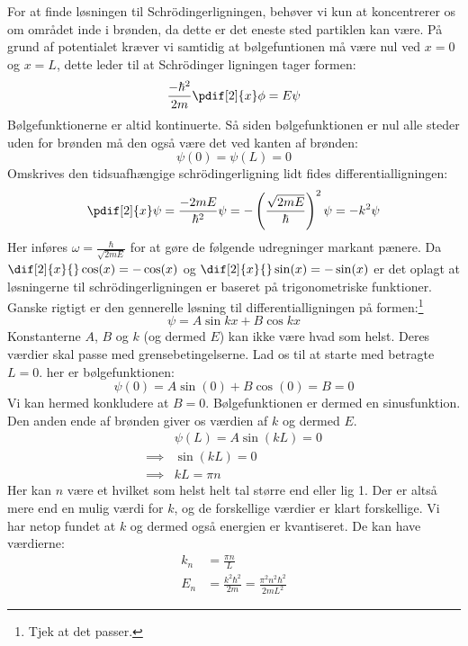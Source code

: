 For at finde løsningen til Schrödingerligningen, behøver vi kun at koncentrerer os om området inde i brønden, da dette er det eneste sted partiklen kan være. På grund af potentialet kræver vi samtidig at bølgefuntionen må være nul ved $x=0$ og $x=L$, dette leder til at Schrödinger ligningen tager formen:
\begin{equation}
    \frac{-\hbar^2}{2m}\pdif[2]{x}\phi=E\psi
    \label{kvant:eq:infb}
\end{equation}
Bølgefunktionerne er altid kontinuerte. Så siden bølgefunktionen er nul alle steder uden for brønden må den også være det ved kanten af brønden:
$$
\psi(0)=\psi(L) = 0
$$
Omskrives den tidsuafhængige schrödingerligning lidt fides differentialligningen:
\begin{equation}
\pdif[2]{x}\psi = \frac{-2mE}{\hbar^2}\psi = -\left(\frac{\sqrt{2mE}}{\hbar}\right)^2\psi = -k^2\psi
\end{equation}
Her inføres $\omega = \frac{\hbar}{\sqrt{2mE}}$ for at gøre de følgende udregninger markant pænere.
Da $\dif[2]{x}{}\cos(x) = -\cos(x)$ og $\dif[2]{x}{}\sin(x) = -\sin(x)$ er det oplagt at løsningerne til schrödingerligningen er baseret på trigonometriske funktioner. Ganske rigtigt er den gennerelle løsning til differentialligningen på formen:\footnote{Tjek at det passer.}
\begin{equation}
\psi = A\sin k x+B\cos k x
\end{equation}
Konstanterne $A$, $B$ og $k$ (og dermed $E$) kan ikke være hvad som helst. Deres værdier skal passe med grensebetingelserne. Lad os til at starte med betragte $L=0$. her er bølgefunktionen:
\begin{equation}
\psi(0) = A\sin(0)+B\cos(0) = B = 0
\end{equation}
Vi kan hermed konkludere at $B=0$. Bølgefunktionen er dermed en sinusfunktion.
Den anden ende af brønden giver os værdien af $k$ og dermed $E$. 
\begin{align*}
&\psi(L) = A\sin(k L) = 0\\
\implies &\sin(k L) = 0\\
\implies &k L = \pi n
\end{align*}
Her kan $n$ være et hvilket som helst helt tal større end eller lig 1. Der er altså mere end en mulig værdi for $k$, og de forskellige værdier er klart forskellige. Vi har netop fundet at $k$ og dermed også energien er kvantiseret. De kan have værdierne:
\begin{align}
k_n &= \frac{\pi n}{L}\\
E_n &= \frac{k^2\hbar^2}{2m} = \frac{\pi^2n^2\hbar^2}{2mL^2}
\end{align}
